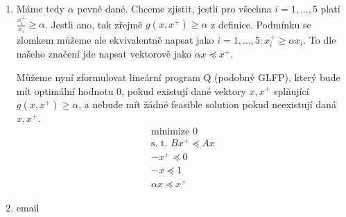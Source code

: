 \documentclass[12pt, a4paper]{article}
\begin{document}
\begin{enumerate}[label=\alph*)]
\item Máme tedy $\alpha$ pevně dané. Chceme zjistit, jestli pro všechna $i=1,\dots,5$ platí $\frac{x_i^+}{x_i} \geq \alpha$. Jestli ano, tak zřejmě $g(x,x^+)\geq \alpha$ z definice. Podmínku se zlomkem můžeme ale ekvivalentně napsat jako $i=1,\dots,5: x_i^+ \geq \alpha x_i$. To dle našeho značení jde napsat vektorově jako $\alpha x \preceq x^+$. 

Můžeme nyní zformulovat lineární program Q (podobný GLFP), který bude mít optimální hodnotu 0, pokud existují dané vektory $x,x^+$ splňující $g(x,x^+)\geq \alpha$, a nebude mít žádné feasible solution pokud neexistují daná $x,x^+$.
\begin{gather*}
\text{minimize } 0\\
\text{s. t. }  Bx^{+} \preceq Ax\\
-x^{+} \preceq 0\\
-x \preceq 1 \\
\alpha x \preceq x^+
\end{gather*}

\item email
\end{enumerate}
\end{document}
